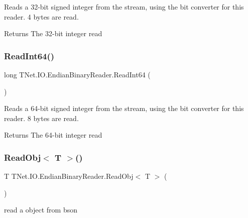 Reads a 32-\/bit signed integer from the stream, using the bit converter for this reader. 4 bytes are read. 

\begin{DoxyReturn}{Returns}
The 32-\/bit integer read
\end{DoxyReturn}
\mbox{\label{class_t_net_1_1_i_o_1_1_endian_binary_reader_aa8f5880eef1ba052963a1728f4f263fd}} 
\subsubsection{\texorpdfstring{Read\+Int64()}{ReadInt64()}}
{\footnotesize\ttfamily long T\+Net.\+I\+O.\+Endian\+Binary\+Reader.\+Read\+Int64 (\begin{DoxyParamCaption}{ }\end{DoxyParamCaption})}



Reads a 64-\/bit signed integer from the stream, using the bit converter for this reader. 8 bytes are read. 

\begin{DoxyReturn}{Returns}
The 64-\/bit integer read
\end{DoxyReturn}
\mbox{\label{class_t_net_1_1_i_o_1_1_endian_binary_reader_affb384d7c877291a2e2aa449f95c780b}} 
\subsubsection{\texorpdfstring{Read\+Obj$<$ T $>$()}{ReadObj< T >()}}
{\footnotesize\ttfamily T T\+Net.\+I\+O.\+Endian\+Binary\+Reader.\+Read\+Obj$<$ T $>$ (\begin{DoxyParamCaption}{ }\end{DoxyParamCaption})}



read a object from bson 


